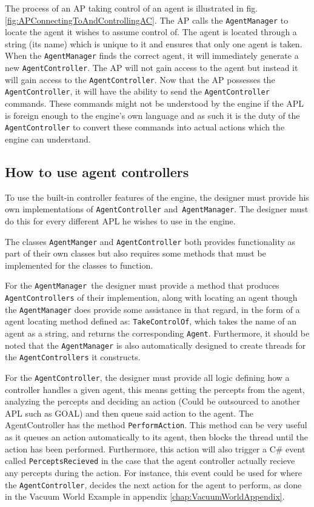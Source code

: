 The process of an AP taking control of an agent is illustrated in
fig. \ref{fig:APConnectingToAndControllingAC}. The AP calls the \texttt{AgentManager}
to locate the agent it wishes to assume control of. The agent is located
through a string (its name) which is unique to it and ensures that
only one agent is taken. When the \texttt{AgentManager} finds the
correct agent, it will immediately generate a new \texttt{AgentController}.
The AP will not gain access to the agent but instead it will gain
access to the \texttt{AgentController}. Now that the AP possesses
the \texttt{AgentController}, it will have the ability to send the
\texttt{AgentController} commands. These commands might not be understood
by the engine if the APL is foreign enough to the engine\textquoteright{}s
own language and as such it is the duty of the \texttt{AgentController}
to convert these commands into actual actions which the engine can
understand.


\subsection{How to use agent controllers}

To use the built-in controller features of the engine, the designer
must provide his own implementations of \texttt{AgentController} and\texttt{
AgentManager}. The designer must do this for every different APL he
wishes to use in the engine.

The classes \texttt{AgentManger} and \texttt{AgentController} both
provides functionality as part of their own classes but also requires
some methods that must be implemented for the classes to function.

For the \texttt{AgentManager }the designer must provide a method that
produces \texttt{AgentControllers} of their implemention, along with
locating an agent though the \texttt{AgentManager} does provide some
assistance in that regard, in the form of a agent locating method
defined as: \texttt{TakeControlOf}, which takes the name of an agent
as a string, and returns the corresponding \texttt{Agent}. Furthermore,
it should be noted that the \texttt{AgentManager} is also automatically
designed to create threads for the \texttt{AgentControllers} it constructs.

For the \texttt{AgentController}, the designer must provide all logic
defining how a controller handles a given agent, this means getting
the percepts from the agent, analyzing the percepts and deciding an
action (Could be outsourced to another APL such as GOAL) and then
queue said action to the agent. The AgentController has the method
\texttt{PerformAction}. This method can be very useful as it queues
an action automatically to its agent, then blocks the thread until
the action has been performed. Furthermore, this action will also
trigger a C\# event called \texttt{PerceptsRecieved} in the case that
the agent controller actually recieve any percepts during the action.
For instance, this event could be used for where the \texttt{AgentController},
decides the next action for the agent to perform, as done in the Vacuum
World Example in appendix \ref{chap:VacuumWorldAppendix}.


